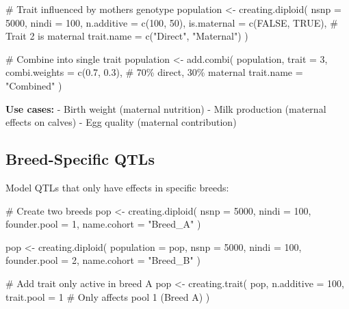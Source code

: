 \documentclass[
  letterpaper,
]{book}
\newenvironment{Shaded}{\begin{snugshade}}{\end{snugshade}}
\newcommand{\AttributeTok}[1]{\textcolor[rgb]{0.40,0.45,0.13}{#1}}
\newcommand{\CommentTok}[1]{\textcolor[rgb]{0.37,0.37,0.37}{#1}}
\newcommand{\ConstantTok}[1]{\textcolor[rgb]{0.56,0.35,0.01}{#1}}
\newcommand{\DecValTok}[1]{\textcolor[rgb]{0.68,0.00,0.00}{#1}}
\newcommand{\FloatTok}[1]{\textcolor[rgb]{0.68,0.00,0.00}{#1}}
\newcommand{\FunctionTok}[1]{\textcolor[rgb]{0.28,0.35,0.67}{#1}}
\newcommand{\NormalTok}[1]{\textcolor[rgb]{0.00,0.23,0.31}{#1}}
\newcommand{\OtherTok}[1]{\textcolor[rgb]{0.00,0.23,0.31}{#1}}
\newcommand{\StringTok}[1]{\textcolor[rgb]{0.13,0.47,0.30}{#1}}
\begin{document}
\begin{Shaded}
\begin{Highlighting}[]
\CommentTok{\# Trait influenced by mother\textquotesingle{}s genotype}
\NormalTok{population }\OtherTok{\textless{}{-}} \FunctionTok{creating.diploid}\NormalTok{(}
  \AttributeTok{nsnp =} \DecValTok{5000}\NormalTok{,}
  \AttributeTok{nindi =} \DecValTok{100}\NormalTok{,}
  \AttributeTok{n.additive =} \FunctionTok{c}\NormalTok{(}\DecValTok{100}\NormalTok{, }\DecValTok{50}\NormalTok{),}
  \AttributeTok{is.maternal =} \FunctionTok{c}\NormalTok{(}\ConstantTok{FALSE}\NormalTok{, }\ConstantTok{TRUE}\NormalTok{),  }\CommentTok{\# Trait 2 is maternal}
  \AttributeTok{trait.name =} \FunctionTok{c}\NormalTok{(}\StringTok{"Direct"}\NormalTok{, }\StringTok{"Maternal"}\NormalTok{)}
\NormalTok{)}

\CommentTok{\# Combine into single trait}
\NormalTok{population }\OtherTok{\textless{}{-}} \FunctionTok{add.combi}\NormalTok{(}
\NormalTok{  population,}
  \AttributeTok{trait =} \DecValTok{3}\NormalTok{,}
  \AttributeTok{combi.weights =} \FunctionTok{c}\NormalTok{(}\FloatTok{0.7}\NormalTok{, }\FloatTok{0.3}\NormalTok{),  }\CommentTok{\# 70\% direct, 30\% maternal}
  \AttributeTok{trait.name =} \StringTok{"Combined"}
\NormalTok{)}
\end{Highlighting}
\end{Shaded}

\textbf{Use cases:} - Birth weight (maternal nutrition) - Milk
production (maternal effects on calves) - Egg quality (maternal
contribution)

\subsection{Breed-Specific QTLs}\label{breed-specific-qtls}

Model QTLs that only have effects in specific breeds:

\begin{Shaded}
\begin{Highlighting}[]
\CommentTok{\# Create two breeds}
\NormalTok{pop }\OtherTok{\textless{}{-}} \FunctionTok{creating.diploid}\NormalTok{(}
  \AttributeTok{nsnp =} \DecValTok{5000}\NormalTok{, }\AttributeTok{nindi =} \DecValTok{100}\NormalTok{,}
  \AttributeTok{founder.pool =} \DecValTok{1}\NormalTok{,}
  \AttributeTok{name.cohort =} \StringTok{"Breed\_A"}
\NormalTok{)}

\NormalTok{pop }\OtherTok{\textless{}{-}} \FunctionTok{creating.diploid}\NormalTok{(}
  \AttributeTok{population =}\NormalTok{ pop, }\AttributeTok{nsnp =} \DecValTok{5000}\NormalTok{, }\AttributeTok{nindi =} \DecValTok{100}\NormalTok{,}
  \AttributeTok{founder.pool =} \DecValTok{2}\NormalTok{,}
  \AttributeTok{name.cohort =} \StringTok{"Breed\_B"}
\NormalTok{)}

\CommentTok{\# Add trait only active in breed A}
\NormalTok{pop }\OtherTok{\textless{}{-}} \FunctionTok{creating.trait}\NormalTok{(}
\NormalTok{  pop,}
  \AttributeTok{n.additive =} \DecValTok{100}\NormalTok{,}
  \AttributeTok{trait.pool =} \DecValTok{1}  \CommentTok{\# Only affects pool 1 (Breed A)}
\NormalTok{)}
\end{Highlighting}
\end{Shaded}
\end{document}
